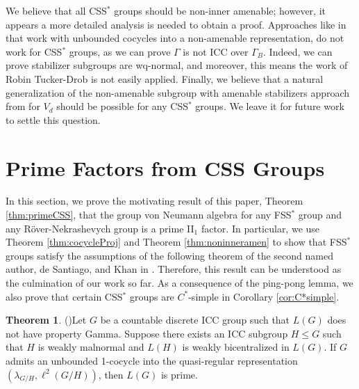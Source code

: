 \documentclass[12pt]{amsart}
\numberwithin{equation}{subsection}
\theoremstyle{definition}
\newtheorem{theorem}{Theorem}[section]
\theoremstyle{definition}
\theoremstyle{remark}
\begin{document}
We believe that all CSS$^*$ groups should be non-inner amenable; however, it appears a more detailed analysis is needed to obtain a proof. Approaches like in \cite{chifan2016inner} that work with unbounded cocycles into a non-amenable representation, do not work for CSS$^*$ groups, as we can prove $\Gamma$ is not ICC over $\Gamma_B$. Indeed, we can prove stabilizer subgroups are wq-normal, and moreover, this means the work of Robin Tucker-Drob is not easily applied. Finally, we believe that a natural generalization of the non-amenable subgroup with amenable stabilizers approach from \cite{bashwinger2022non} for $V_d$ should be possible for any CSS$^*$ groups. We leave it for future work to settle this question. 

\section{Prime Factors from CSS Groups}\label{sec:prime}

In this section, we prove the motivating result of this paper, Theorem \ref{thm:primeCSS}, that the group von Neumann algebra for any FSS$^*$ group and any R\"over-Nekrashevych group is a prime II$_1$ factor. In particular, we use Theorem \ref{thm:cocycleProj} and Theorem \ref{thm:noninneramen} to show that FSS$^*$ groups satisfy the assumptions of the following theorem of the second named author, de Santiago, and Khan in \cite{de2023mcduff}. Therefore, this result can be understood as the culmination of our work so far. As a consequence of the ping-pong lemma, we also prove that certain CSS$^*$ groups are $C^*$-simple in Corollary \ref{cor:C*simple}.



 \begin{theorem}(\cite[Theorem 4.10]{de2023mcduff})\label{thm:primevNa}
     Let $G$ be a countable discrete ICC group such that $L(G)$ does not have property Gamma. Suppose there exists an ICC subgroup $H\leq G$ such that $H$ is weakly malnormal and $L(H)$ is weakly bicentralized in $L(G)$. If $G$ admits an unbounded 1-cocycle into the quasi-regular representation $(\lambda_{G/H},\ell^2(G/H))$, then $L(G)$ is prime.
 \end{theorem}
\end{document}
